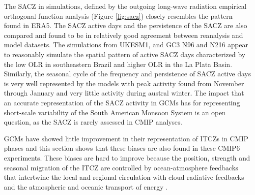 
 
 
 The SACZ in  simulations, defined by the outgoing long-wave radiation empirical orthogonal function analysis (Figure \ref{fig:sacz}) closely resembles the pattern found in ERA5. The SACZ active days and the persistence of the SACZ are also compared and found to be in relatively good agreement between reanalysis and model datasets.
The simulations from UKESM1, and GC3 N96 and N216 appear to reasonably simulate the spatial pattern of active SACZ days characterized by the low OLR in southeastern Brazil and higher OLR in the La Plata Basin. Similarly, the seasonal cycle of the frequency and persistence of SACZ active days is very well represented by the models with peak activity found from November through January and very little activity during austral winter. The impact that an accurate representation of the SACZ activity in GCMs has for representing short-scale variability of the South American Monsoon System is an open question, as the SACZ is rarely assessed in CMIP analyses.

GCMs have showed little improvement in their representation of ITCZs in CMIP phases\citep{oueslati2015} and this section shows that these biases are also found in these CMIP6 experiments. These biases are hard to improve because the position, strength and seasonal migration of the ITCZ are controlled by ocean-atmosphere feedbacks that intertwine the local and regional circulation with cloud-radiative feedbacks and the atmospheric and oceanic transport of energy \citep{schneider2014,oueslati2015,byrne2016,byrne2020}. 


